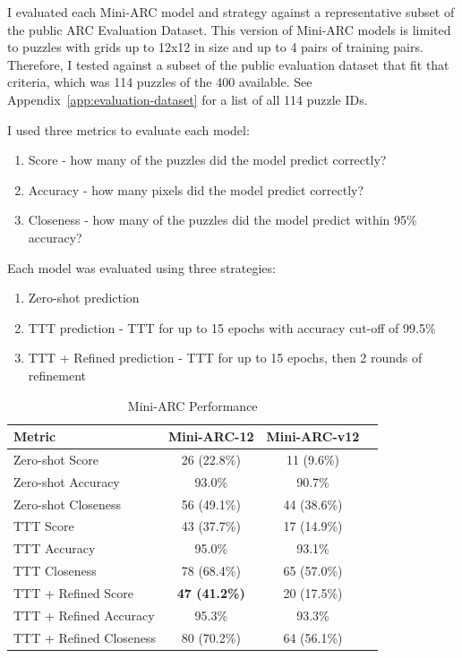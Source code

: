 \documentclass[10pt,twocolumn]{article}
\begin{document}
I evaluated each Mini-ARC model and strategy against a representative
subset of the public ARC Evaluation Dataset. This version of Mini-ARC models
is limited to puzzles with grids up to 12x12 in size and up to 4
pairs of training pairs. Therefore, I tested against a subset of the
public evaluation dataset that fit that criteria, which was 114
puzzles of the 400 available. See
Appendix~\ref{app:evaluation-dataset} for a list of all 114 puzzle IDs.

I used three metrics to evaluate each model:

\begin{enumerate}
  \item Score - how many of the puzzles did the model
    predict correctly?
  \item Accuracy - how many pixels did the model predict correctly?
  \item Closeness - how many of the puzzles did the model predict
    within 95\% accuracy?
\end{enumerate}

Each model was evaluated using three strategies:
\begin{enumerate}
  \item Zero-shot prediction
  \item TTT prediction - TTT for up to 15 epochs with accuracy cut-off of 99.5\%
  \item TTT + Refined prediction - TTT for up to 15 epochs, then 2
    rounds of refinement
\end{enumerate}

\begin{table}
  \centering
  \caption{Mini-ARC Performance}
  \begin{tabular}{lccc}
    \toprule
    \textbf{Metric} & \textbf{Mini-ARC-12} &
    \textbf{Mini-ARC-v12} \\
    \midrule
    Zero-shot Score & 26 (22.8\%) & 11 (9.6\%)  \\
    Zero-shot Accuracy & 93.0\% & 90.7\%  \\
    Zero-shot Closeness & 56 (49.1\%) & 44 (38.6\%)  \\
    \addlinespace
    \cmidrule{1-3}
    TTT Score & 43 (37.7\%) & 17 (14.9\%)  \\
    TTT Accuracy & 95.0\% & 93.1\%  \\
    TTT Closeness & 78 (68.4\%) & 65 (57.0\%) \\
    \addlinespace
    \cmidrule{1-3}
    TTT + Refined Score  & \textbf{47 (41.2\%)} & 20 (17.5\%)  \\
    TTT + Refined Accuracy  & 95.3\% & 93.3\%  \\
    TTT + Refined Closeness  & 80 (70.2\%) & 64 (56.1\%)  \\
    \bottomrule
  \end{tabular}
  \label{tab:performance}
\end{table}
\end{document}
